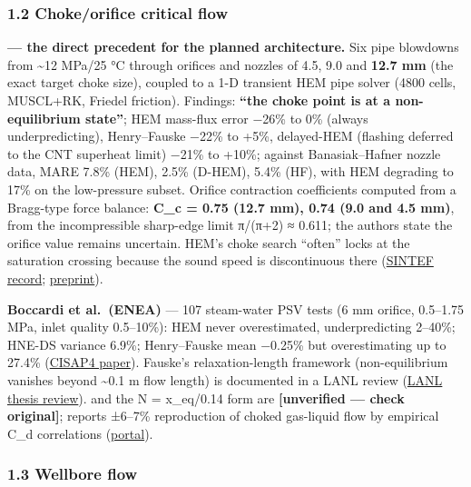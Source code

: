 \hypertarget{chokeorifice-critical-flow}{%
\subsubsection{1.2 Choke/orifice critical
flow}\label{chokeorifice-critical-flow}}

\textbf{\citet{hammer2022} --- the direct precedent for the planned architecture.} Six
pipe blowdowns from \textasciitilde12 MPa/25 °C through orifices and
nozzles of 4.5, 9.0 and \textbf{12.7 mm} (the exact target choke size),
coupled to a 1-D transient HEM pipe solver (4800 cells, MUSCL+RK,
Friedel friction). Findings: \textbf{``the choke point is at a
non-equilibrium state''}; HEM mass-flux error −26\% to 0\% (always
underpredicting), Henry--Fauske −22\% to +5\%, delayed-HEM (flashing
deferred to the CNT superheat limit) −21\% to +10\%; against
Banasiak--Hafner nozzle data, MARE 7.8\% (HEM), 2.5\% (D-HEM), 5.4\%
(HF), with HEM degrading to 17\% on the low-pressure subset. Orifice
contraction coefficients computed from a Bragg-type force balance:
\textbf{C\_c = 0.75 (12.7 mm), 0.74 (9.0 and 4.5 mm)}, from the
incompressible sharp-edge limit π/(π+2) ≈ 0.611; the authors state the
orifice value remains uncertain. HEM's choke search ``often'' locks at
the saturation crossing because the sound speed is discontinuous there
(\href{https://sintef.brage.unit.no/sintef-xmlui/handle/11250/3023978}{SINTEF
record};
\href{https://www.pvv.ntnu.no/~stm/dring/outflow_preprint.pdf}{preprint}).

\textbf{Boccardi et al.~(ENEA)} --- 107 steam-water PSV tests (6 mm
orifice, 0.5--1.75 MPa, inlet quality 0.5--10\%): HEM never
overestimated, underpredicting 2--40\%; HNE-DS variance 6.9\%;
Henry--Fauske mean −0.25\% but overestimating up to 27.4\%
(\href{https://www.aidic.it/CISAP4/webpapers/33Boccardi.pdf}{CISAP4
paper}). Fauske's relaxation-length framework (non-equilibrium vanishes
beyond \textasciitilde0.1 m flow length) is documented in a LANL review
(\href{https://public.lanl.gov/davidp/MSThesisHTML/2.html}{LANL thesis
review}). \citet{henry1971} and the N = x\_eq/0.14 form are \textbf{{[}unverified --- check
original{]}}; \citet{morris1990} reports
±6--7\% reproduction of choked gas-liquid flow by empirical C\_d
correlations
(\href{https://researchportal.hw.ac.uk/en/publications/discharge-coefficients-for-choked-gas-liquid-flow-through-nozzles/}{portal}).

\hypertarget{wellbore-flow}{%
\subsubsection{1.3 Wellbore flow}\label{wellbore-flow}}

